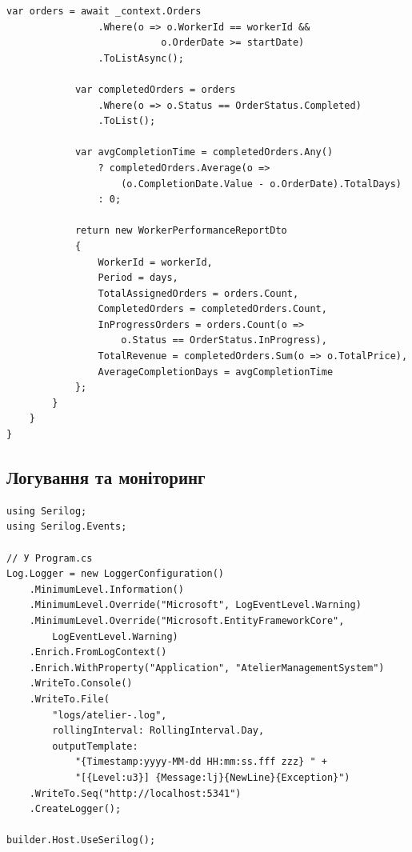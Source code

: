 \documentclass[14pt,a4paper]{extarticle}
\begin{document}
\begin{lstlisting}[language={[Sharp]C}, caption=Сервіс формування звітів, basicstyle=\small\ttfamily, breaklines=true, frame=single]
            var orders = await _context.Orders
                .Where(o => o.WorkerId == workerId &&
                           o.OrderDate >= startDate)
                .ToListAsync();
            
            var completedOrders = orders
                .Where(o => o.Status == OrderStatus.Completed)
                .ToList();
            
            var avgCompletionTime = completedOrders.Any()
                ? completedOrders.Average(o => 
                    (o.CompletionDate.Value - o.OrderDate).TotalDays)
                : 0;
            
            return new WorkerPerformanceReportDto
            {
                WorkerId = workerId,
                Period = days,
                TotalAssignedOrders = orders.Count,
                CompletedOrders = completedOrders.Count,
                InProgressOrders = orders.Count(o => 
                    o.Status == OrderStatus.InProgress),
                TotalRevenue = completedOrders.Sum(o => o.TotalPrice),
                AverageCompletionDays = avgCompletionTime
            };
        }
    }
}
\end{lstlisting}

\newpage
\subsection{Логування та моніторинг}

\begin{lstlisting}[language={[Sharp]C}, caption=Конфігурація Serilog, basicstyle=\small\ttfamily, breaklines=true, frame=single]
using Serilog;
using Serilog.Events;

// У Program.cs
Log.Logger = new LoggerConfiguration()
    .MinimumLevel.Information()
    .MinimumLevel.Override("Microsoft", LogEventLevel.Warning)
    .MinimumLevel.Override("Microsoft.EntityFrameworkCore", 
        LogEventLevel.Warning)
    .Enrich.FromLogContext()
    .Enrich.WithProperty("Application", "AtelierManagementSystem")
    .WriteTo.Console()
    .WriteTo.File(
        "logs/atelier-.log",
        rollingInterval: RollingInterval.Day,
        outputTemplate: 
            "{Timestamp:yyyy-MM-dd HH:mm:ss.fff zzz} " +
            "[{Level:u3}] {Message:lj}{NewLine}{Exception}")
    .WriteTo.Seq("http://localhost:5341")
    .CreateLogger();

builder.Host.UseSerilog();
\end{lstlisting}
\end{document}
